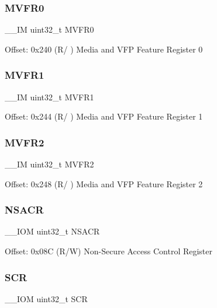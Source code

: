 \subsubsection{\texorpdfstring{MVFR0}{MVFR0}}
{\footnotesize\ttfamily \+\_\+\+\_\+\+IM uint32\+\_\+t M\+V\+F\+R0}

Offset\+: 0x240 (R/ ) Media and V\+FP Feature Register 0 \mbox{\label{struct_s_c_b___type_a0a610dc4212de3ce1ad62e9afa76c728}} 
\subsubsection{\texorpdfstring{MVFR1}{MVFR1}}
{\footnotesize\ttfamily \+\_\+\+\_\+\+IM uint32\+\_\+t M\+V\+F\+R1}

Offset\+: 0x244 (R/ ) Media and V\+FP Feature Register 1 \mbox{\label{struct_s_c_b___type_a8353348c9336aa1aadcbf86b6f0f18c9}} 
\subsubsection{\texorpdfstring{MVFR2}{MVFR2}}
{\footnotesize\ttfamily \+\_\+\+\_\+\+IM uint32\+\_\+t M\+V\+F\+R2}

Offset\+: 0x248 (R/ ) Media and V\+FP Feature Register 2 \mbox{\label{struct_s_c_b___type_a3b7fa817ab498ce63563c73ae316c9b6}} 
\subsubsection{\texorpdfstring{NSACR}{NSACR}}
{\footnotesize\ttfamily \+\_\+\+\_\+\+I\+OM uint32\+\_\+t N\+S\+A\+CR}

Offset\+: 0x08C (R/W) Non-\/\+Secure Access Control Register \mbox{\label{struct_s_c_b___type_acac65f229cb3fcb5369a0a9e0393b8c0}} 
\subsubsection{\texorpdfstring{SCR}{SCR}}
{\footnotesize\ttfamily \+\_\+\+\_\+\+I\+OM uint32\+\_\+t S\+CR}

